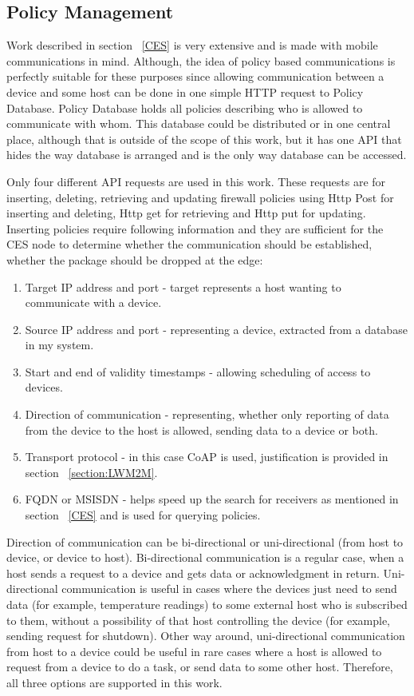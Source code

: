 \subsection{Policy Management}
\label{policyManagement}

Work described in section ~\ref{CES} is very extensive and is made with mobile communications in mind. Although, the idea of policy based communications is perfectly suitable for these purposes since allowing communication between a device and some host can be done in one simple HTTP request to Policy Database. Policy Database holds all policies describing who is allowed to communicate with whom. This database could be distributed or in one central place, although that is outside of the scope of this work, but it has one API that hides the way database is arranged and is the only way database can be accessed. 

Only four different API requests are used in this work. These requests are for inserting, deleting, retrieving and updating firewall policies using Http Post for inserting and deleting, Http get for retrieving and Http put for updating. Inserting policies require following information and they are sufficient for the CES node to determine whether the communication should be established, whether the package should be dropped at the edge: 

\begin{enumerate}
	\setlength{\itemsep}{1pt}
	\item Target IP address and port - target represents a host wanting to communicate with a device.
	\item Source IP address and port - representing a device, extracted from a database in my system.
	\item Start and end of validity timestamps - allowing scheduling of access to devices.
	\item Direction of communication - representing, whether only reporting of data from the device to the host is allowed, sending data to a device or both.
	\item Transport protocol - in this case CoAP is used, justification is provided in section ~\ref{section:LWM2M}.
	\item FQDN or MSISDN - helps speed up the search for receivers as mentioned in section ~\ref{CES} and is used for querying policies.
\end{enumerate}

Direction of communication can be bi-directional or uni-directional (from host to device, or device to host). Bi-directional communication is a regular case, when a host sends a request to a device and gets data or acknowledgment in return. Uni-directional communication is useful in cases where the devices just need to send data (for example, temperature readings) to some external host who is subscribed to them, without a possibility of that host controlling the device (for example, sending request for shutdown). Other way around, uni-directional communication from host to a device could be useful in rare cases where a host is allowed to request from a device to do a task, or send data to some other host. Therefore, all three options are supported in this work.

